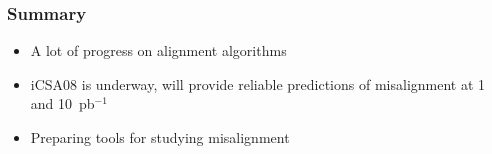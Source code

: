 \documentclass[compress]{beamer}
\begin{document}

\begin{frame}
\frametitle{Summary}

\begin{itemize}\setlength{\itemsep}{0.5 cm}
\item A lot of progress on alignment algorithms
\item iCSA08 is underway, will provide reliable predictions of misalignment at 1 and 10~pb$^{-1}$
\item Preparing tools for studying misalignment
\end{itemize}

\label{numpages}
\end{frame}
\end{document}
